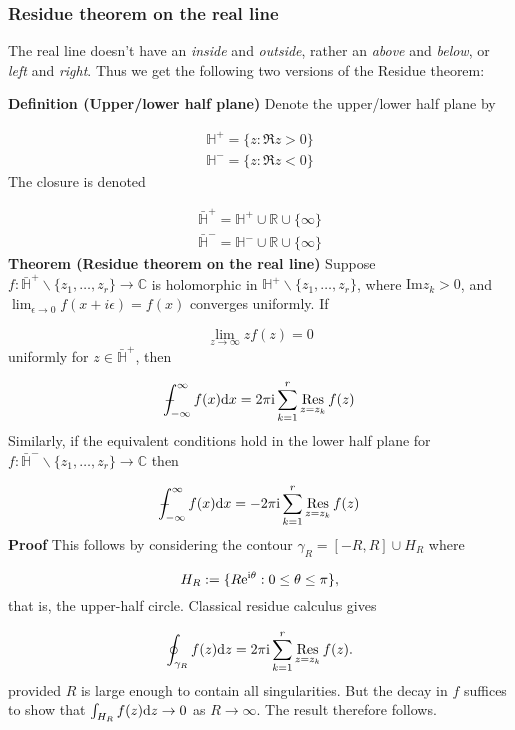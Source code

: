 \documentclass[12pt,a4paper]{article}
\def\D{ {\rm d} }
\def\I{ {\rm i} }
\def\E{ {\rm e} }
\def\Xint#1{ \mathchoice
   {\XXint\displaystyle\textstyle{#1} }%
   {\XXint\textstyle\scriptstyle{#1} }%
   {\XXint\scriptstyle\scriptscriptstyle{#1} }%
   {\XXint\scriptscriptstyle\scriptscriptstyle{#1} }%
   \!\int}
\def\XXint#1#2#3{ {\setbox0=\hbox{$#1{#2#3}{\int}$}
     \vcenter{\hbox{$#2#3$}}\kern-.5\wd0} }
\def\dashint{\Xint-}
\def\infdashint{\dashint_{-\infty}^\infty}
\def\dx{\D x}
\def\dz{\D z}
\begin{document}
\subsubsection{Residue theorem on the real line}
The real line doesn't have an \emph{inside} and \emph{outside}, rather an \emph{above} and \emph{below}, or \emph{left} and \emph{right}. Thus we get the following two versions of the Residue theorem:

\textbf{Definition (Upper/lower half plane)} Denote the upper/lower half plane by


\begin{align*}
{\mathbb H}^+ = \{z : \Re z > 0 \}  \\
{\mathbb H}^- = \{z : \Re z < 0 \}
\end{align*}
The closure is denoted


\begin{align*}
\bar{\mathbb H}^+ = {\mathbb H}^+ \cup {\mathbb R} \cup \{\infty\}  \\
\bar{\mathbb H}^- = {\mathbb H}^- \cup {\mathbb R} \cup \{\infty\}
\end{align*}
\textbf{Theorem (Residue theorem on the real line)} Suppose $f : \bar {\mathbb H}^+ \backslash \{z_1,\ldots,z_r \} \rightarrow {\mathbb C}$ is holomorphic in ${\mathbb H}^+ \backslash \{z_1,\ldots,z_r \}$, where $\mathrm{Im } z_k > 0$, and  $\lim_{\epsilon \rightarrow 0} f(x + i \epsilon) = f(x)$ converges uniformly.  If

\[
\lim_{z \rightarrow \infty} z f(z) = 0
\]
uniformly for $z \in \bar {\mathbb H}^+$, then

\[
\infdashint f(x) \dx = 2 \pi \I \sum_{k=1}^r {\underset{z = z_k}{\rm Res}} \, f(z)
\]
Similarly, if the equivalent conditions hold in the lower half plane for $f : \bar{\mathbb H}^- \backslash \{z_1,\ldots,z_r \} \rightarrow {\mathbb C}$ then

\[
\infdashint f(x) \dx = -2 \pi \I \sum_{k=1}^r {\underset{z = z_k}{\rm Res}} \, f(z)
\]
\textbf{Proof} This follows by considering  the contour $\gamma_R = [-R,R] \cup H_R$ where

\[
H_R := \{ R \E^{\I \theta} : 0 \leq \theta \leq \pi \},
\]
that is, the upper-half circle. Classical residue calculus gives

\[
\oint_{\gamma_R} f(z) \dz =  2\pi \I \sum_{k=1}^r {\underset{z = z_k}{\rm Res}} \, f(z).
\]
provided $R$ is large enough to contain all singularities. But the decay in $f$ suffices to show that $\int_{H_R} f(z) \D z \rightarrow 0$ as $R \rightarrow \infty$. The result therefore follows.
\end{document}
